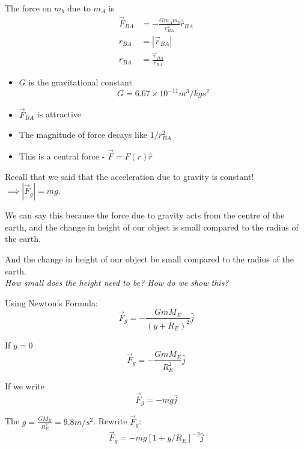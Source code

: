 \documentclass[10pt]{scrartcl}
\begin{document}
The force on $m_b$ due to $m_A$ is 
\[
\begin{aligned}
\vec{F}_{BA} &= -\frac{Gm_Am_b}{r^2_{BA}}\hat{r}_{BA}\\
r_{BA} &= |\vec{r}_{BA}|\\
\hat{r}_{BA} &= \frac{\vec{r}_{BA}}{r_{BA}}
\end{aligned}
\]

\begin{itemize}
\item $G$ is the gravitational constant 
\[G = 6.67 \times 10^{-11} m^3/kgs^2\]	
\item $\vec{F}_{BA}$ is attractive
\item The magnitude of force decays like $1/r^2_{BA}$ 
\item This is a central force - $\vec{F} = F(r)\hat{r}$
\end{itemize}

Recall that we said that the acceleration due to gravity is constant! $\implies |\vec{F}_g| = mg$.

We can say this because the force due to gravity acts from the centre of the earth, and the change in height of our object is small compared to the radius of the earth.

And the change in height of our object be small compared to the radius of the earth.\\

\emph{How small does the height need to be? How do we show this?} 

\begin{center}
\end{center}

Using Newton's Formula:
\[\vec{F}_g = -\frac{GmM_E}{(y+R_E)^2}\hat{j}\]

If $y =0$
\[\vec{F}_g = -\frac{GmM_E}{R_E^2}\hat{j}\]

If we write 
\[\vec{F}_g = -mg\hat{j}\]

The $g = \frac{GM_E}{R^2_E} = 9.8m/s^2$. Rewrite $\vec{F}_g$:
\[\vec{F}_g = -mg[1 + y/R_E]^{-2}\hat{j}\]
\end{document}
